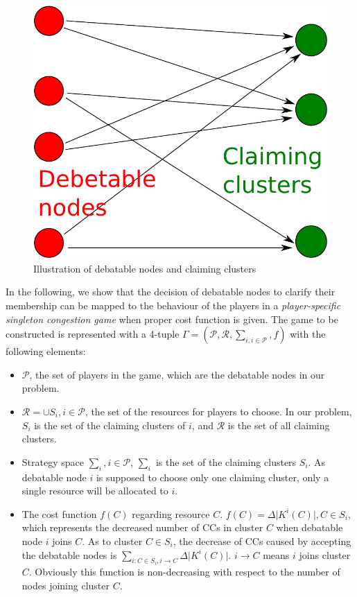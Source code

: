 \documentclass[times]{ettauth}
\theoremstyle{mytheoremstyle}
\theoremstyle{mytheoremstyle}
\theoremstyle{mytheoremstyle}
\begin{document}
\begin{figure}[ht!]
  \centering
  \includegraphics[width=0.37\linewidth]{singletongame_matching.pdf}
  \caption{Illustration of debatable nodes and claiming clusters}
  \label{debatable_nodes_claiming_cluster}
\end{figure}


In the following, we show that the decision of debatable nodes to clarify their membership can be mapped to the behaviour of the players in a \textit{player-specific singleton congestion game} when proper cost function is given.
The game to be constructed is represented with a 4-tuple $\Gamma=(\mathcal{P},\mathcal{R},\sum_{i, i \in \mathcal{P}}, f)$ with the following elements:

\begin{itemize}
	\item $\mathcal{P}$, the set of players in the game, which are the debatable nodes in our problem.
	\item $\mathcal{R} = \cup S_i, i\in \mathcal{P}$, the set of the resources for players to choose. In our problem, $S_i$ is the set of the claiming clusters of $i$, and $\mathcal{R}$ is the set of all claiming clusters.
	\item Strategy space $\sum_i, i \in \mathcal{P}$, $\sum_i$ is the set of the claiming clusters $S_i$.
	As debatable node $i$ is supposed to choose only one claiming cluster, only a single resource will be allocated to $i$.%
	\item 	The cost function $f(C)$ regarding resource $C$. 
	$f(C) = \Delta\vert K^i(C)|, C\in S_i$, which represents the decreased number of CCs in cluster $C$ when debatable node $i$ joins $C$.
	As to cluster $C\in S_i$, the decrease of CCs caused by accepting the debatable nodes is $\sum_{i:C\in S_i, i\rightarrow C} \Delta\vert K^i(C) \vert$. 
$i\rightarrow C$ means $i$ joins cluster $C$.
Obviously this function is non-decreasing with respect to the number of nodes joining cluster $C$.
\end{itemize}
	
\end{document}
